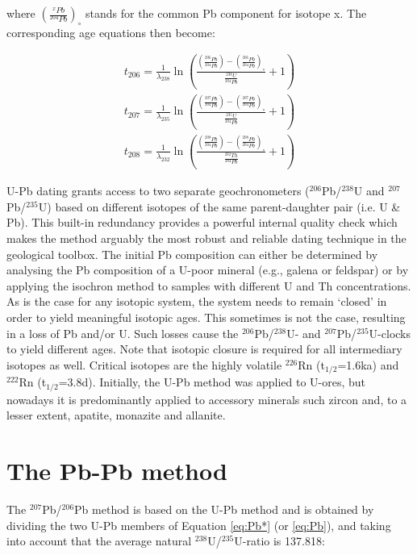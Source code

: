 \documentclass{book}
\begin{document}
where $\left(\frac{^{x}Pb}{^{204}Pb}\right)_\circ$ stands for the
common Pb component for isotope x. The corresponding age equations
then become:

\begin{equation}
\begin{array}{c}
  t_{206}=\frac{1}{\lambda_{238}}\ln\left(\frac{\left(\frac{^{206}Pb}{^{204}Pb}\right)-
    \left(\frac{^{206}Pb}{^{204}Pb}\right)_\circ}{\frac{^{238}U}{^{204}Pb}}+1\right)\\
  t_{207}=\frac{1}{\lambda_{235}}\ln\left(\frac{\left(\frac{^{207}Pb}{^{204}Pb}\right)-
    \left(\frac{^{207}Pb}{^{204}Pb}\right)_\circ}{\frac{^{235}U}{^{204}Pb}}+1\right)\\
  t_{208}=\frac{1}{\lambda_{232}}\ln\left(\frac{\left(\frac{^{208}Pb}{^{204}Pb}\right)-
    \left(\frac{^{208}Pb}{^{204}Pb}\right)_\circ}{\frac{^{232}Th}{^{204}Pb}}+1\right)
\end{array}
\label{eq:tPb}
\end{equation}

U-Pb dating grants access to two separate geochronometers
($^{206}$Pb/${}^{238}$U and $^{207}$Pb/${}^{235}$U) based on different
isotopes of the same parent-daughter pair (i.e. U \& Pb).  This
built-in redundancy provides a powerful internal quality check which
makes the method arguably the most robust and reliable dating
technique in the geological toolbox. The initial Pb composition can
either be determined by analysing the Pb composition of a U-poor
mineral (e.g., galena or feldspar) or by applying the isochron method
to samples with different U and Th concentrations. As is the case for
any isotopic system, the system needs to remain `closed' in order to
yield meaningful isotopic ages.  This sometimes is not the case,
resulting in a loss of Pb and/or U.  Such losses cause the
$^{206}$Pb/$^{238}$U- and $^{207}$Pb/$^{235}$U-clocks to yield
different ages. Note that isotopic closure is required for all
intermediary isotopes as well.  Critical isotopes are the highly
volatile $^{226}$Rn (t$_{1/2}$=1.6ka) and $^{222}$Rn
(t$_{1/2}$=3.8d). Initially, the U-Pb method was applied to U-ores,
but nowadays it is predominantly applied to accessory minerals such
zircon and, to a lesser extent, apatite, monazite and allanite.

\section{The Pb-Pb method}
\label{sec:Pb-Pb}

The $^{207}$Pb/$^{206}$Pb method is based on the U-Pb method and is
obtained by dividing the two U-Pb members of Equation \ref{eq:Pb*} (or
\ref{eq:Pb}), and taking into account that the average natural
$^{238}$U/$^{235}$U-ratio is 137.818:
\end{document}
